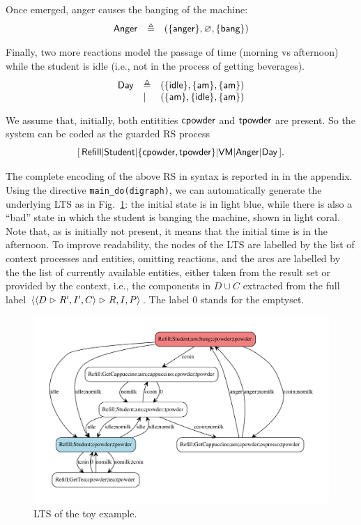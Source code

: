 Once emerged, anger causes the banging of the machine:
\[
\begin{array}{lll}
\mathsf{Anger} & \triangleq & (\{{\text{\sffamily anger}}\},\varnothing,\{{\text{\sffamily bang}}\})
\end{array}
\]

Finally, two more reactions model the passage of time (morning vs afternoon) while the student is idle (i.e., not in the process of getting beverages).
\[
\begin{array}{lll}
\mathsf{Day} & \triangleq & (\{{\text{\sffamily idle}}\},\{{\text{\sffamily am}}\},\{{\text{\sffamily am}}\})\\
& | & (\{{\text{\sffamily am}}\},\{{\text{\sffamily idle}}\},\{{\text{\sffamily am}}\})
\end{array}
\]

We assume that, initially, both entitities ${\text{\sffamily cpowder}}$ and ${\text{\sffamily tpowder}}$ are present.
So the system can be coded as the guarded RS process
\[
[\,\mathsf{Refill}
| \mathsf{Student}
| \{{\text{\sffamily cpowder}},{\text{\sffamily tpowder}}\} 
| \mathsf{VM}
| \mathsf{Anger}
| \mathsf{Day}\,] .
\]

The complete encoding of the above RS in \BioResolve syntax is reported in  in the appendix.
Using the \BioResolve directive \verb=main_do(digraph)=, we can automatically generate the underlying LTS as in Fig.~\ref{fig:toylts}: the initial state is in light blue, while there is also a ``bad'' state in which the student is banging the machine, shown in light coral.
Note that, as \am is initially not present, it means that the initial time is in the afternoon.
To improve readability, the nodes of the LTS are labelled by the list of context processes and entities, omitting reactions, and the arcs are labelled by the the list of currently available entities, either taken from the result set or provided by the context, i.e., the components in $D\cup C$ extracted from the full label $\langle \langle D\vartriangleright R',I',C\rangle\vartriangleright R,I,P\rangle$. The label $0$ stands for the emptyset.

\begin{figure}
\includegraphics[scale=.3]{./figs/toylts}
\caption{LTS of the toy example.\label{fig:toylts}}
\end{figure}

